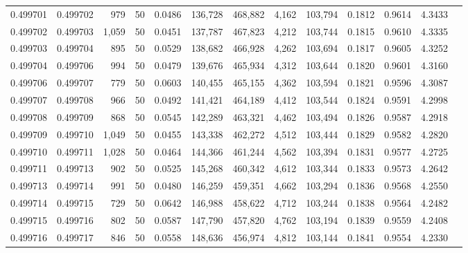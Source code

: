 \begin{tabular}{rrrrrrrrrrrrr}
0.499701 & 0.499702 &   979 &  50 &                                     0.0486 & 136,728 & 468,882 &   4,162 & 103,794 & 0.1812 & 0.9614 & 4.3433 \\
0.499702 & 0.499703 & 1,059 &  50 &                                     0.0451 & 137,787 & 467,823 &   4,212 & 103,744 & 0.1815 & 0.9610 & 4.3335 \\
0.499703 & 0.499704 &   895 &  50 &                                     0.0529 & 138,682 & 466,928 &   4,262 & 103,694 & 0.1817 & 0.9605 & 4.3252 \\
0.499704 & 0.499706 &   994 &  50 &                                     0.0479 & 139,676 & 465,934 &   4,312 & 103,644 & 0.1820 & 0.9601 & 4.3160 \\
0.499706 & 0.499707 &   779 &  50 &                                     0.0603 & 140,455 & 465,155 &   4,362 & 103,594 & 0.1821 & 0.9596 & 4.3087 \\
0.499707 & 0.499708 &   966 &  50 &                                     0.0492 & 141,421 & 464,189 &   4,412 & 103,544 & 0.1824 & 0.9591 & 4.2998 \\
0.499708 & 0.499709 &   868 &  50 &                                     0.0545 & 142,289 & 463,321 &   4,462 & 103,494 & 0.1826 & 0.9587 & 4.2918 \\
0.499709 & 0.499710 & 1,049 &  50 &                                     0.0455 & 143,338 & 462,272 &   4,512 & 103,444 & 0.1829 & 0.9582 & 4.2820 \\
0.499710 & 0.499711 & 1,028 &  50 &                                     0.0464 & 144,366 & 461,244 &   4,562 & 103,394 & 0.1831 & 0.9577 & 4.2725 \\
0.499711 & 0.499713 &   902 &  50 &                                     0.0525 & 145,268 & 460,342 &   4,612 & 103,344 & 0.1833 & 0.9573 & 4.2642 \\
0.499713 & 0.499714 &   991 &  50 &                                     0.0480 & 146,259 & 459,351 &   4,662 & 103,294 & 0.1836 & 0.9568 & 4.2550 \\
0.499714 & 0.499715 &   729 &  50 &                                     0.0642 & 146,988 & 458,622 &   4,712 & 103,244 & 0.1838 & 0.9564 & 4.2482 \\
0.499715 & 0.499716 &   802 &  50 &                                     0.0587 & 147,790 & 457,820 &   4,762 & 103,194 & 0.1839 & 0.9559 & 4.2408 \\
0.499716 & 0.499717 &   846 &  50 &                                     0.0558 & 148,636 & 456,974 &   4,812 & 103,144 & 0.1841 & 0.9554 & 4.2330 \\

\end{tabular}
